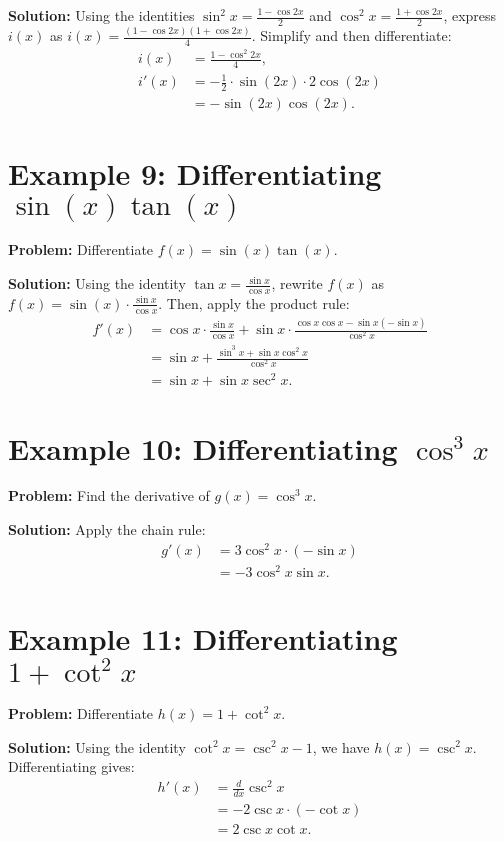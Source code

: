 \documentclass[a4paper,12pt]{book}
\begin{document}
\textbf{Solution:}
Using the identities $\sin^2 x = \frac{1 - \cos 2x}{2}$ and $\cos^2 x = \frac{1 + \cos 2x}{2}$, express $i(x)$ as $i(x) = \frac{(1 - \cos 2x)(1 + \cos 2x)}{4}$. Simplify and then differentiate:
\begin{align*}
i(x) &= \frac{1 - \cos^2 2x}{4}, \\
i'(x) &= -\frac{1}{2} \cdot \sin(2x) \cdot 2\cos(2x) \\
&= -\sin(2x)\cos(2x).
\end{align*}



\section*{Example 9: Differentiating $\sin(x)\tan(x)$}
\textbf{Problem:} Differentiate $f(x) = \sin(x)\tan(x)$.

\textbf{Solution:}
Using the identity $\tan x = \frac{\sin x}{\cos x}$, rewrite $f(x)$ as $f(x) = \sin(x) \cdot \frac{\sin x}{\cos x}$. Then, apply the product rule:
\begin{align*}
f'(x) &= \cos x \cdot \frac{\sin x}{\cos x} + \sin x \cdot \frac{\cos x \cos x - \sin x (-\sin x)}{\cos^2 x} \\
&= \sin x + \frac{\sin^3 x + \sin x \cos^2 x}{\cos^2 x} \\
&= \sin x + \sin x \sec^2 x.
\end{align*}

\section*{Example 10: Differentiating $\cos^3 x$}
\textbf{Problem:} Find the derivative of $g(x) = \cos^3 x$.

\textbf{Solution:}
Apply the chain rule:
\begin{align*}
g'(x) &= 3\cos^2 x \cdot (-\sin x) \\
&= -3\cos^2 x \sin x.
\end{align*}

\section*{Example 11: Differentiating $1 + \cot^2 x$}
\textbf{Problem:} Differentiate $h(x) = 1 + \cot^2 x$.

\textbf{Solution:}
Using the identity $\cot^2 x = \csc^2 x - 1$, we have $h(x) = \csc^2 x$. Differentiating gives:
\begin{align*}
h'(x) &= \frac{d}{dx} \csc^2 x \\
&= -2\csc x \cdot (-\cot x) \\
&= 2\csc x \cot x.
\end{align*}
\end{document}
